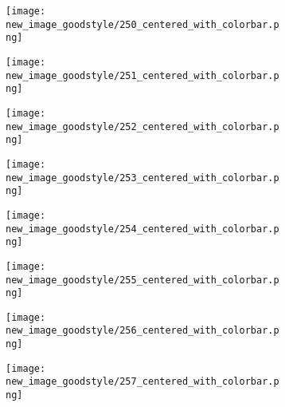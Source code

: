 \documentclass[a4paper,12pt]{article}
\begin{document}
\begin{figure}[H]
  \begin{subfigure}{0.11\textwidth}
    \texttt{[image: new\_image\_goodstyle/250\_centered\_with\_colorbar.png]}
  \end{subfigure}
  \hfill
  \begin{subfigure}{0.11\textwidth}
    \texttt{[image: new\_image\_goodstyle/251\_centered\_with\_colorbar.png]}
  \end{subfigure}
  \hfill
  \begin{subfigure}{0.11\textwidth}
    \texttt{[image: new\_image\_goodstyle/252\_centered\_with\_colorbar.png]}
  \end{subfigure}
  \hfill
  \begin{subfigure}{0.11\textwidth}
    \texttt{[image: new\_image\_goodstyle/253\_centered\_with\_colorbar.png]}
  \end{subfigure}
  \hfill
  \begin{subfigure}{0.11\textwidth}
    \texttt{[image: new\_image\_goodstyle/254\_centered\_with\_colorbar.png]}
  \end{subfigure}
  \hfill
  \begin{subfigure}{0.11\textwidth}
    \texttt{[image: new\_image\_goodstyle/255\_centered\_with\_colorbar.png]}
  \end{subfigure}
  \hfill
  \begin{subfigure}{0.11\textwidth}
    \texttt{[image: new\_image\_goodstyle/256\_centered\_with\_colorbar.png]}
  \end{subfigure}
  \hfill
  \begin{subfigure}{0.11\textwidth}
    \texttt{[image: new\_image\_goodstyle/257\_centered\_with\_colorbar.png]}
  \end{subfigure}
  \hfill
\end{figure}
\end{document}
